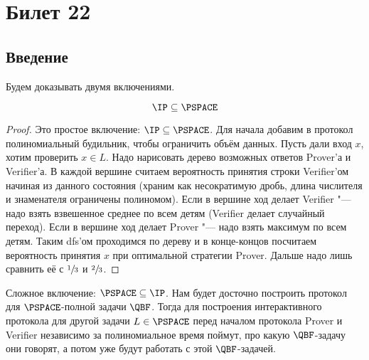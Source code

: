 \setcounter{section}{21}
\section{Билет 22}
\subsection{Введение}
	Будем доказывать двумя включениями.
	\begin{lemma}
		\[ \IP \subseteq \PSPACE \]
	\end{lemma}
	\begin{proof}
		Это простое включение: $\IP \subseteq \PSPACE$.
		Для начала добавим в протокол полиномиальный будильник, чтобы ограничить объём данных.
		Пусть дали вход $x$, хотим проверить $x \in L$.
		Надо нарисовать дерево возможных ответов Prover'а и Verifier'а.
		В каждой вершине считаем вероятность принятия строки Verifier'ом начиная из данного состояния (храним как несократимую дробь, длина числителя и знаменателя ограничены полиномом).
		Если в вершине ход делает Verifier "--- надо взять взвешенное среднее по всем детям (Verifier делает случайный переход).
		Если в вершине ход делает Prover "--- надо взять максимум по всем детям.
		Таким dfs'ом проходимся по дереву и в конце-концов посчитаем вероятность принятия $x$ при оптимальной стратегии Prover.
		Дальше надо лишь сравнить её с $\sfrac13$ и $\sfrac 23$.
	\end{proof}

	Сложное включение: $\PSPACE \subseteq \IP$.
	Нам будет досточно построить протокол для $\PSPACE$-полной задачи $\QBF$.
	Тогда для построения интерактивного протокола для другой задачи $L \in \PSPACE$ перед началом протокола Prover и Verifier независимо за полиномиальное время поймут, про
	какую $\QBF$-задачу они говорят, а потом уже будут работать с этой $\QBF$-задачей.

